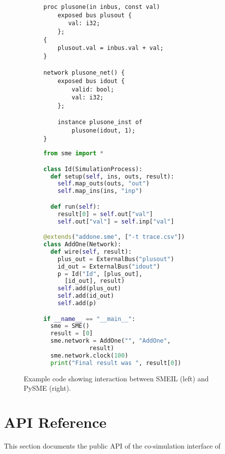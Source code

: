 \begin{figure}
  \centerfloat
  \begin{subfigure}[t]{0.40\paperwidth}
\begin{lstlisting}[language=smeil]
proc plusone(in inbus, const val)
    exposed bus plusout {
       val: i32;
    };
{
    plusout.val = inbus.val + val;
}

network plusone_net() {
    exposed bus idout {
        valid: bool;
        val: i32;
    };

    instance plusone_inst of
        plusone(idout, 1);
}
\end{lstlisting}
    
  \end{subfigure}
  \begin{subfigure}[t]{0.40\paperwidth}
    \begin{lstlisting}[language=python]
from sme import *

class Id(SimulationProcess):
  def setup(self, ins, outs, result):
    self.map_outs(outs, "out")
    self.map_ins(ins, "inp")

  def run(self):
    result[0] = self.out["val"]
    self.out["val"] = self.inp["val"]

@extends("addone.sme", ["-t trace.csv"])
class AddOne(Network):
  def wire(self, result):
    plus_out = ExternalBus("plusout")
    id_out = ExternalBus("idout")
    p = Id("Id", [plus_out],
      [id_out], result)
    self.add(plus_out)
    self.add(id_out)
    self.add(p)

if __name__ == "__main__":
  sme = SME()
  result = [0]
  sme.network = AddOne("", "AddOne",
             result)
  sme.network.clock(100)
  print("Final result was ", result[0])
  \end{lstlisting}
  \end{subfigure}

  \caption{Example code showing interaction between SMEIL (left) and PySME
    (right).}
\label{fig:smeilpy}
\end{figure}

\section{API Reference}
This section documents the public API of the co-simulation interface of \libsme{}

